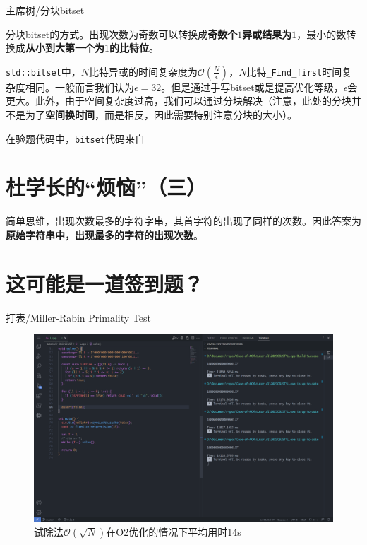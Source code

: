 \documentclass[12pt, UTF8]{ctexart}
\theoremstyle{mystyle}
\begin{document}
主席树/分块bitset\par
分块bitset的方式。出现次数为奇数可以转换成\textbf{奇数个$1$异或结果为$1$}，最小的数转换成\textbf{从小到大第一个为$1$的比特位}。\par
\texttt{std::bitset}中，$N$比特异或的时间复杂度为$\mathcal{O}(\frac{N}{\epsilon})$，$N$比特\texttt{\_Find\_first}时间复杂度相同。一般而言我们认为$\epsilon=32$。但是通过手写bitset或是提高优化等级，$\epsilon$会更大。此外，由于空间复杂度过高，我们可以通过分块解决（注意，此处的分块并不是为了\textbf{空间换时间}，而是相反，因此需要特别注意分块的大小）。\par
在验题代码中，\texttt{bitset}代码来自

\section{杜学长的“烦恼”（三）}

简单思维，出现次数最多的字符字串，其首字符的出现了同样的次数。因此答案为\textbf{原始字符串中，出现最多的字符的出现次数}。

\section{这可能是一道签到题？}

打表/Miller-Rabin Primality Test

\begin{figure}[H]
  \centering
  \includegraphics[width=\textwidth]{L.png}
  \caption{试除法$\mathcal{O}(\sqrt{N})$在O2优化的情况下平均用时14s}
  \label{Fig.sqrt}
\end{figure}
\end{document}
